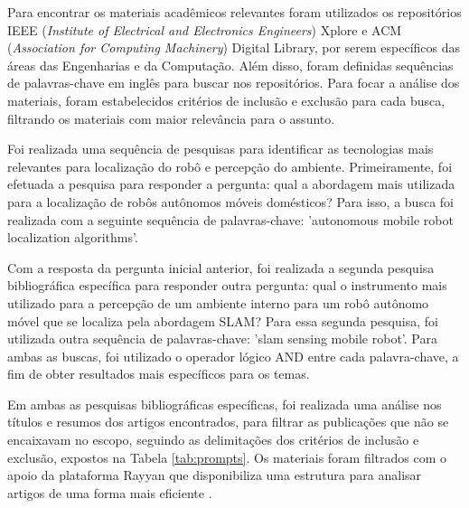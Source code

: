 Para encontrar os materiais acadêmicos relevantes foram utilizados os repositórios IEEE (\textit{Institute of Electrical and Electronics Engineers}) Xplore e ACM (\textit{Association for Computing Machinery}) Digital Library, por serem específicos das áreas das Engenharias e da Computação. Além disso, foram definidas sequências de palavras-chave em inglês para buscar nos repositórios. Para focar a análise dos materiais, foram estabelecidos critérios de inclusão e exclusão para cada busca, filtrando os materiais com maior relevância para o assunto. 

Foi realizada uma sequência de pesquisas para identificar as tecnologias mais relevantes para localização do robô e percepção do ambiente. Primeiramente, foi efetuada a pesquisa para responder a pergunta: qual a abordagem mais utilizada para a localização de robôs autônomos móveis domésticos? Para isso, a busca foi realizada com a seguinte sequência de palavras-chave: 'autonomous mobile robot localization algorithms'. 

Com a resposta da pergunta inicial anterior, foi realizada a segunda pesquisa bibliográfica específica para responder outra pergunta: qual o instrumento mais utilizado para a percepção de um ambiente interno para um robô autônomo móvel que se localiza pela abordagem SLAM? Para essa segunda pesquisa, foi utilizada outra sequência de palavras-chave: 'slam sensing mobile robot'. Para ambas as buscas, foi utilizado o operador lógico AND entre cada palavra-chave, a fim de obter resultados mais específicos para os temas.

Em ambas as pesquisas bibliográficas específicas, foi realizada uma análise nos títulos e resumos dos artigos encontrados, para filtrar as publicações que não se encaixavam no escopo, seguindo as delimitações dos critérios de inclusão e exclusão, expostos na Tabela \ref{tab:prompts}. Os materiais foram filtrados com o apoio da plataforma Rayyan que disponibiliza uma estrutura para analisar artigos de uma forma mais eficiente \cite{rayyan}. 

